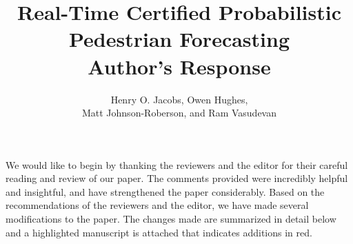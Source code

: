 \documentclass[usenames,dvipsnames]{article}
\title{\LARGE Real-Time Certified Probabilistic Pedestrian Forecasting \\ \textbf{Author's Response} }
\author{Henry O. Jacobs, Owen Hughes, \\ Matt Johnson-Roberson, and Ram Vasudevan }
\newcommand{\todo}[1]{\textcolor{red}{#1}}
\begin{document}
\maketitle


We would like to begin by thanking the reviewers and the editor for their careful reading and review of our paper.
The comments provided were incredibly helpful and insightful, and have strengthened the paper considerably.
Based on the recommendations of the reviewers and the editor, we have made several modifications to the paper.
The changes made are summarized in detail below and a highlighted manuscript is attached that indicates additions in red.
\end{document}
